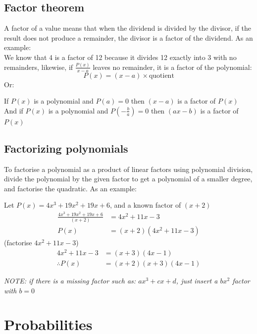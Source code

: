 \documentclass[a4paper,10pt]{report}
\begin{document}
\subsection{Factor theorem}
A factor of a value means that when the dividend is divided by the divisor, if the result does not produce a remainder, the divisor is a factor of the dividend.  As an example:\\
We know that 4 is a factor of 12 because it divides 12 exactly into 3 with no remainders, likewise, if $\frac{P(x)}{x - a}$ leaves no remainder, it is a factor of the polynomial:\\
$$
	P(x) = (x - a) \times \text{quotient}
$$
Or:
\begin{center}
	If $P(x)$ is a polynomial and $P(a) = 0$ then $(x - a)$ is a factor of $P(x)$\\
	And if $P(x)$ is a polynomial and $P(-\frac{b}{a}) = 0$ then $(ax - b)$ is a factor of $P(x)$
\end{center}

\subsection{Factorizing polynomials}
To factorise a polynomial as a product of linear factors using polynomial division, divide the polynomial by the given factor to get a polynomial of a smaller degree, and factorise the quadratic.  As an example:\\
\begin{center}
	Let $P(x) = 4x^3 + 19x^2 + 19x + 6$, and a known factor of $(x + 2)$
	\begin{align*}
		\frac{4x^3 + 19x^2 + 19x + 6}{(x + 2)} & = 4x^2 + 11x - 3          \\
		P(x)                                   & = (x + 2)(4x^2 + 11x - 3)
	\end{align*}
	(factorise $4x^2 + 11x - 3$)
	\begin{align*}
		4x^2 + 11x - 3  & = (x + 3)(4x - 1)        \\
		\therefore P(x) & = (x + 2)(x + 3)(4x - 1)
	\end{align*}
\end{center}

\begin{center}
	\emph{NOTE: if there is a missing factor such as: $ax^3 + cx + d$, just insert a $bx^2$ factor with $b = 0$}
\end{center}

\section{Probabilities}
\end{document}
